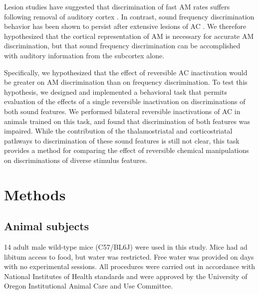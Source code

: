 Lesion studies have suggested that discrimination of fast AM rates suffers
following removal of auditory cortex \citep{Deutscher2006}.
%
In contrast, sound frequency discrimination behavior has been shown to persist
after extensive lesions of AC \citep{Gimenez2015}.
%
We therefore hypothesized that the cortical representation of AM is necessary
for accurate AM discrimination, but that sound frequency discrimination can be
accomplished with auditory information from the subcortex alone. 

Specifically, we hypothesized that the effect of reversible AC inactivation
would be greater on AM discrimination than on frequency discrimination. 
%
To test this hypothesis, we designed and implemented a behavioral task that
permits evaluation of the effects of a single reversible inactivation on
discriminations of both sound features.
%
We performed bilateral reversible inactivations of AC in animals trained on
this task, and found that discrimination of both features was impaired. 
%
While the contribution of the thalamostriatal and corticostriatal pathways to
discrimination of these sound features is still not clear, this task provides a
method for comparing the effect of reversible chemical manipulations on
discriminations of diverse stimulus features. 


\section{Methods}

\subsection{Animal subjects}
14 adult male wild-type mice (C57/BL6J) were used in this study. Mice had ad
libitum access to food, but water was restricted. Free water was provided on
days with no experimental sessions. All procedures were carried out in
accordance with National Institutes of Health standards and were approved by
the University of Oregon Institutional Animal Care and Use Committee.

